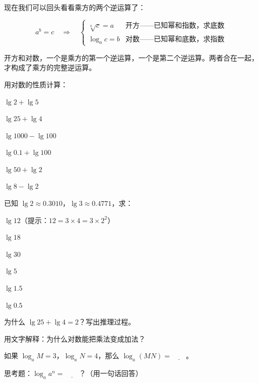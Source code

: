 现在我们可以回头看看乘方的两个逆运算了：

\[
a^b = c \quad\Longrightarrow\quad
\begin{cases}
\sqrt[b]{c} = a & \text{开方——已知幂和指数，求底数}\\
\log_a c = b & \text{对数——已知幂和底数，求指数}
\end{cases}
\]

开方和对数，一个是乘方的第一个逆运算，一个是第二个逆运算。两者合在一起，才构成了乘方的完整逆运算。

\begin{exercise}
\item 用对数的性质计算：
  \begin{subexercise}
    \item $\lg 2 + \lg 5$
    \item $\lg 25 + \lg 4$
    \item $\lg 1000 - \lg 100$
    \item $\lg 0.1 + \lg 100$
    \item $\lg 50 + \lg 2$
    \item $\lg 8 - \lg 2$
  \end{subexercise}

\item 已知 $\lg 2 \approx 0.3010$，$\lg 3 \approx 0.4771$，求：
  \begin{subexercise}
    \item $\lg 12$（提示：$12=3\times4=3\times2^2$）
    \item $\lg 18$
    \item $\lg 30$
    \item $\lg 5$
    \item $\lg 1.5$
    \item $\lg 0.5$
  \end{subexercise}

\item 为什么 $\lg 25 + \lg 4 = 2$？写出推理过程。

\item 用文字解释：为什么对数能把乘法变成加法？

\item 如果 $\log_a M = 3$，$\log_a N = 4$，那么 $\log_a (MN) = \underline{\qquad}$。

\item 思考题：$\log_a a^n = \underline{\qquad}$？（用一句话回答）


\end{exercise}
